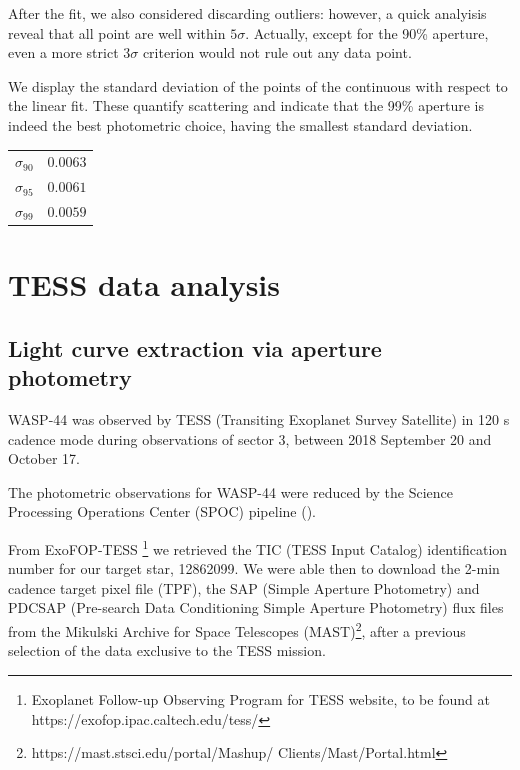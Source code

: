 \documentclass[a4paper,11pt,twocolumn]{article}
\begin{document}
After the fit, we also considered discarding outliers: however, a quick 
analyisis reveal that all point are well within $5\sigma$. Actually, 
except for the 90\% aperture, even a more strict $3\sigma$ criterion 
would not rule out any data point.

We display the standard deviation of the points of the 
continuous with respect to the linear fit. These quantify scattering and 
indicate that the 99\% aperture is indeed the best photometric choice, 
having the smallest standard deviation.
\begin{center}
    \begin{tabular}{cc}
    \hline
    $\sigma_{90}$ & $0.0063$ \\
    $\sigma_{95}$ & $0.0061$ \\
    $\sigma_{99}$ & $0.0059$ \\
    \hline
    \end{tabular}
\end{center}





\section{TESS data analysis}



\subsection{Light curve extraction via aperture photometry}

WASP-44 was observed by TESS (Transiting Exoplanet Survey Satellite) in 120 s cadence mode during observations of sector 3, between 2018 September 20 and October 17.

The photometric observations for WASP-44 were reduced by the Science Processing Operations Center (SPOC) pipeline (\cite{Jenkins}).

From ExoFOP-TESS \footnote{Exoplanet Follow-up Observing Program for TESS website, to be found at https://exofop.ipac.caltech.edu/tess/} 
we retrieved the TIC (TESS Input Catalog) identification number for our target star, 12862099.
We were able then to download the 2-min cadence target pixel file (TPF), the SAP (Simple Aperture Photometry) and 
PDCSAP (Pre-search Data Conditioning Simple Aperture Photometry) flux files from the Mikulski Archive for Space 
Telescopes (MAST)\footnote{https://mast.stsci.edu/portal/Mashup/ Clients/Mast/Portal.html}, after a previous selection 
of the data exclusive to the TESS mission.
\end{document}
